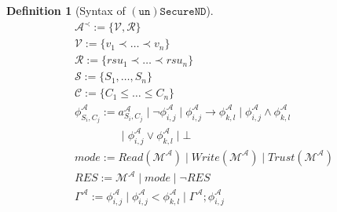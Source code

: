\documentclass[compsoc, conference, letterpaper, 10pt, times]{IEEEtran}
\newtheorem{definition}{Definition}
\begin{document}
\begin{definition}[Syntax of $\mathtt{(un)SecureND}$]\label{def:syntax} %
	\begin{displaymath}
	\begin{array}{l}
	\mathcal{A}^{\prec}:= \{\mathcal{V, R}\}\\
	\mathcal{V}:= \{v_{1}\prec \ldots \prec v_{n}\}\\
	\mathcal{R}:= \{rsu_{1}\prec\ldots \prec rsu_{n}\}\\
	\mathcal{S}:= \{S_1, \dots, S_{n}\}\\  %
	\mathcal{C}:= \{C_{1}\leq \dots \leq C_{n}\}\\  %
	\phi^{\mathcal{A}}_{S_{i}, C_{j}}:= a^{\mathcal{A}}_{S_{i},C_{j}}\mid \neg \phi^{\mathcal{A}}_{i,j}\mid \phi^{\mathcal{A}}_{i,j}\rightarrow \phi^{\mathcal{A}}_{k,l}\mid \phi^{\mathcal{A}}_{i,j}\wedge \phi^{\mathcal{A}}_{k,l}\\
	\qquad \qquad \mid \phi^{\mathcal{A}}_{i,j}\vee \phi^{\mathcal{A}}_{k,l} \mid \bot\\
	mode:= Read(\mathcal{M}^{\mathcal{A}})\mid Write(\mathcal{M}^{\mathcal{A}})\mid Trust(\mathcal{M}^{\mathcal{A}})\\
	RES:= \mathcal{M}^{\mathcal{A}}\mid mode\mid \neg RES\\
	\Gamma^{\mathcal{A}}:= 
	\phi^{\mathcal{A}}_{i,j} \mid \phi^{\mathcal{A}}_{i,j} < \phi^{\mathcal{A}}_{k,l} \mid \Gamma^{\mathcal{A}}; \phi^{\mathcal{A}}_{i,j}
	
	\end{array}
	\end{displaymath}
\end{definition}
%
\end{document}
